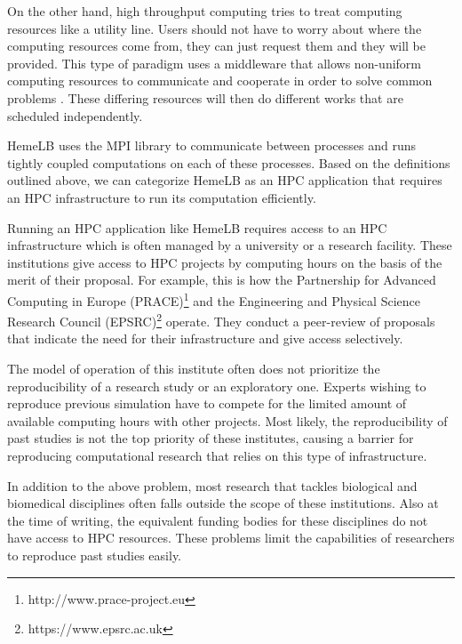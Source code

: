 On the other hand, high throughput computing tries to treat computing resources like a utility line. Users should not have to worry about where the computing resources come from, they can just request them and they will be provided. This type of paradigm uses a middleware that allows non-uniform computing resources to communicate and cooperate in order to solve common problems \citep{Micro31:online}. These differing resources will then do different works that are scheduled independently. 

HemeLB uses the MPI library to communicate between processes and runs tightly coupled computations on each of these processes. Based on the definitions outlined above, we can categorize HemeLB as an HPC application that requires an HPC infrastructure to run its computation efficiently. 

Running an HPC application like HemeLB requires access to an HPC infrastructure which is often managed by a university or a research facility. These institutions give access to HPC projects by computing hours on the basis of the merit of their proposal. For example, this is how the Partnership for Advanced Computing in Europe (PRACE)\footnote{http://www.prace-project.eu} and the Engineering and Physical Science Research Council (EPSRC)\footnote{https://www.epsrc.ac.uk} operate. They conduct a peer-review of proposals that indicate the need for their infrastructure and give access selectively.

The model of operation of this institute often does not prioritize the reproducibility of a research study or an exploratory one. Experts wishing to reproduce previous simulation have to compete for the limited amount of available computing hours with other projects. Most likely, the reproducibility of past studies is not the top priority of these institutes, causing a barrier for reproducing computational research that relies on this type of infrastructure.


In addition to the above problem, most research that tackles biological and biomedical disciplines often falls outside the scope of these institutions. Also at the time of writing, the equivalent funding bodies for these disciplines do not have access to HPC resources. These problems limit the capabilities of researchers to reproduce past studies easily. 


